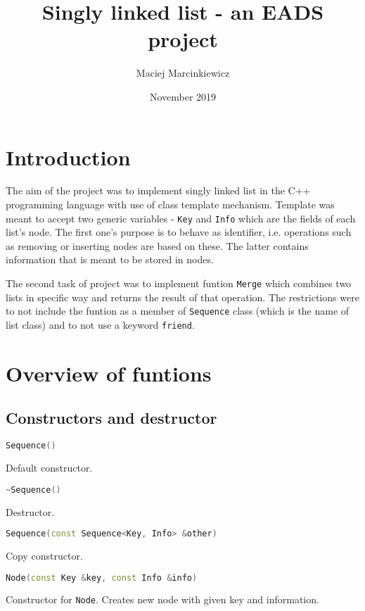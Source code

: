 \documentclass{article}
\title{Singly linked list - an EADS project}
\author{Maciej Marcinkiewicz}
\date{November 2019}
\begin{document}
\maketitle

\section{Introduction}

The aim of the project was to implement singly linked list in the C++ programming
language with use of class template mechanism. Template was meant to accept two generic
variables - {\tt Key} and {\tt Info} which are the fields of each list's node. The first
one's purpose is to behave as identifier, i.e. operations such as removing or inserting
nodes are based on these. The latter contains information that is meant to be stored
in nodes.

\indent
The second task of project was to implement funtion {\tt Merge} which combines two lists
in specific way and returns the result of that operation. The restrictions were to not
include the funtion as a member of {\tt Sequence} class (which is the name of list class)
and to not use a keyword {\tt friend}.

\section{Overview of funtions}

\subsection{Constructors and destructor}

\begin{lstlisting}[language=C++]
Sequence()
\end{lstlisting}
Default constructor.

\begin{lstlisting}[language=C++]
~Sequence()
\end{lstlisting}
Destructor.

\begin{lstlisting}[language=C++]
Sequence(const Sequence<Key, Info> &other)
\end{lstlisting}
Copy constructor.

\begin{lstlisting}[language=C++]
Node(const Key &key, const Info &info)
\end{lstlisting}
Constructor for {\tt Node}. Creates new node with given key and information.
\vspace{\baselineskip}
\end{document}
